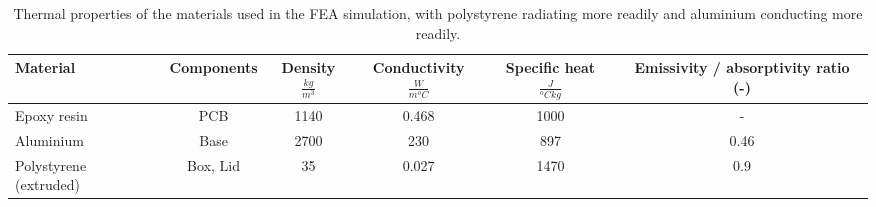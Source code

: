 
\begin{center}
\begin{table}[ht]
\centering
\begin{adjustbox}{max width=\textwidth}
  \begin{tabular}{ | l | c | c | c | c | c | }
    \hline
    \textbf{Material} & \textbf{Components} & \textbf{Density $ \frac{kg}{m^3} $ } & \textbf{Conductivity $ \frac{W}{m ^oC} $} &\textbf{Specific heat $ \frac{J}{^oC kg} $} & \textbf{Emissivity / absorptivity  ratio (-)} \\ \hline
    Epoxy resin  & PCB & 1140 & 0.468 & 1000 & -\\ \hline
    Aluminium & Base & 2700 & 230 & 897 & 0.46\\ \hline
    Polystyrene (extruded)  & Box, Lid & 35 & 0.027 & 1470 & 0.9\\ \hline
  \end{tabular}
\end{adjustbox}
\caption{Thermal properties of the materials used in the FEA simulation, with polystyrene radiating more readily and aluminium conducting more readily.}
\end{table}
\label{tab: thermal materials}
\end{center}